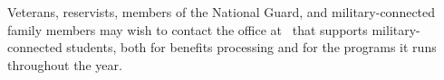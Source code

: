 Veterans, reservists, members of the National Guard, and military-connected
family members may wish to contact the office at \GetInstitution\ that supports
military-connected students, both for benefits processing and for the programs
it runs throughout the year.
